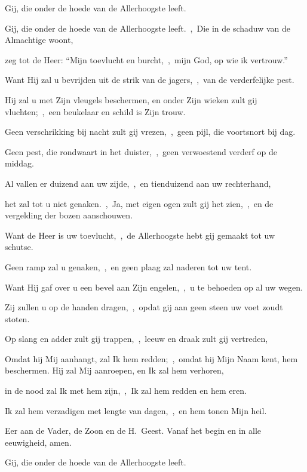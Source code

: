 \documentclass[12pt,twoside,a5paper]{article}
\begin{document}
\begin{halfparskip}
   Gij, die onder de hoede van de Allerhoogste leeft.


  Gij, die onder de hoede van de Allerhoogste leeft.~\sep\ Die in de schaduw van de Almachtige woont,

  zeg tot de Heer: ``Mijn toevlucht en burcht,~\sep\ mijn God, op wie ik vertrouw.''

  Want Hij zal u bevrijden uit de strik van de jagers,~\sep\ van de verderfelijke pest.

  Hij zal u met Zijn vleugels beschermen, en onder Zijn wieken zult gij vluchten;~\sep\ een beukelaar en schild is Zijn trouw.

  Geen verschrikking bij nacht zult gij vrezen,~\sep\ geen pijl, die voortsnort bij dag.

  Geen pest, die rondwaart in het duister,~\sep\ geen verwoestend verderf op de middag.

  Al vallen er duizend aan uw zijde,~\sep\ en tienduizend aan uw rechterhand,

  het zal tot u niet genaken.~\sep\ Ja, met eigen ogen zult gij het zien,~\sep\ en de vergelding der bozen aanschouwen.

  Want de Heer is uw toevlucht,~\sep\ de Allerhoogste hebt gij gemaakt tot uw schutse.

  Geen ramp zal u genaken,~\sep\ en geen plaag zal naderen tot uw tent.

  Want Hij gaf over u een bevel aan Zijn engelen,~\sep\ u te behoeden op al uw wegen.

  Zij zullen u op de handen dragen,~\sep\ opdat gij aan geen steen uw voet zoudt stoten.

  Op slang en adder zult gij trappen,~\sep\ leeuw en draak zult gij vertreden,

  Omdat hij Mij aanhangt, zal Ik hem redden;~\sep\ omdat hij Mijn Naam kent, hem beschermen. Hij zal Mij aanroepen, en Ik zal hem verhoren,

  in de nood zal Ik met hem zijn,~\sep\ Ik zal hem redden en hem eren.

  Ik zal hem verzadigen met lengte van dagen,~\sep\ en hem tonen Mijn heil.

  Eer aan de Vader, de Zoon en de H.~Geest. Vanaf het begin en in alle eeuwigheid, amen.

   Gij, die onder de hoede van de Allerhoogste leeft.

\end{halfparskip}
\end{document}
